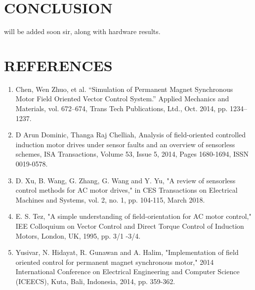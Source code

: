 \section{CONCLUSION}

will be added soon sir, along with hardware results.
\newpage


\section*{\centering REFERENCES}


\begin{enumerate}
\item Chen, Wen Zhuo, et al. “Simulation of Permanent Magnet Synchronous Motor Field Oriented Vector Control System.” Applied Mechanics and Materials, vol. 672–674, Trans Tech Publications, Ltd., Oct. 2014, pp. 1234–1237.


\vspace{5mm} %

\item D Arun Dominic, Thanga Raj Chelliah,
Analysis of field-oriented controlled induction motor drives under sensor faults and an overview of sensorless schemes,
ISA Transactions,
Volume 53, Issue 5,
2014,
Pages 1680-1694,
ISSN 0019-0578.

\vspace{5mm} %

\item D. Xu, B. Wang, G. Zhang, G. Wang and Y. Yu, "A review of sensorless control methods for AC motor drives," in CES Transactions on Electrical Machines and Systems, vol. 2, no. 1, pp. 104-115, March 2018.


\vspace{5mm} %

\item  E. S. Tez, "A simple understanding of field-orientation for AC motor control," IEE Colloquium on Vector Control and Direct Torque Control of Induction Motors, London, UK, 1995, pp. 3/1 -3/4.

\vspace{5mm} %


\item  Yusivar, N. Hidayat, R. Gunawan and A. Halim, "Implementation of field oriented control for permanent magnet synchronous motor," 2014 International Conference on Electrical Engineering and Computer Science (ICEECS), Kuta, Bali, Indonesia, 2014, pp. 359-362.

\end{enumerate}

